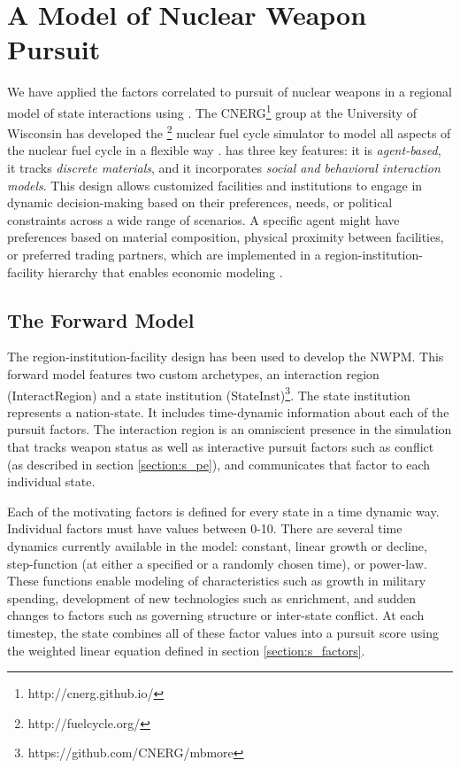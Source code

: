 \section{A \Cyclus Model of Nuclear Weapon Pursuit}
\label{s_methods}

We have applied the factors correlated to pursuit of nuclear weapons in a regional model of state interactions using \Cyclus\cite{huff_open_2011,huff_fundamental_2016,gidden_agent-based_2013}.  The \gls{CNERG}\footnote{http://cnerg.github.io/} group at the University of Wisconsin has developed the \Cyclus\footnote{http://fuelcycle.org/} nuclear fuel cycle simulator to model all aspects of the nuclear fuel cycle in a flexible way \cite{cyclus_v1_3}.  \Cyclus has three key features: it is \textit{agent-based}, it tracks \textit{discrete materials}, and it incorporates \textit{social and behavioral interaction models}\cite{jennings_agent-based_2000, taylor2014agent}. This design allows customized facilities and institutions to engage in dynamic decision-making based on their preferences, needs, or political constraints across a wide range of scenarios.  A specific agent might have preferences based on material composition, physical proximity between facilities, or preferred trading partners, which are implemented in a region-institution-facility hierarchy that enables economic modeling \cite{oliver_geniusv2:_2009}.

\subsection{The Forward Model}

The region-institution-facility design has been used to develop the \gls{NWPM}. This forward model features two custom archetypes, an interaction region (InteractRegion) and a state institution (StateInst)\footnote{https://github.com/CNERG/mbmore}.  The state institution represents a nation-state.  It includes time-dynamic information about each of the pursuit factors. The interaction region is an omniscient presence in the simulation that tracks weapon status as well as interactive pursuit factors such as conflict (as described in section \ref{section:s_pe}), and communicates that factor to each individual state. 

Each of the motivating factors is defined for every state in a time dynamic way. Individual factors must have values between 0-10. There are several time dynamics currently available in the model: constant, linear growth or decline, step-function (at either a specified or a randomly chosen time), or power-law.  These functions enable modeling of characteristics such as growth in military spending, development of new technologies such as enrichment, and sudden changes to factors such as governing structure or inter-state conflict.  At each timestep, the state combines all of these factor values into a pursuit score using the weighted linear equation defined in section \ref{section:s_factors}.

